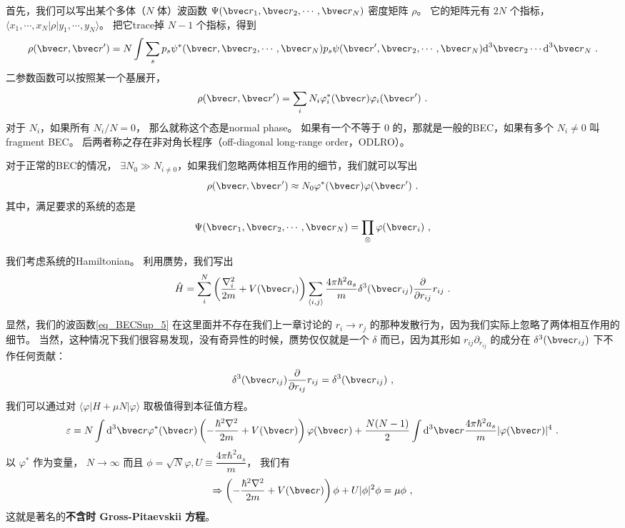 首先，我们可以写出某个多体（$N$ 体）波函数 $\Psi({\bvec r}_1,{\bvec r}_2,\cdots,{\bvec r}_N)$ 密度矩阵 $\rho$。 它的矩阵元有 $2N$ 个指标， $\langle x_1,\cdots,x_N|\rho|y_1,\cdots,y_N\rangle$。 把它trace掉 $N-1$ 个指标，得到
\begin{equation}
\rho({\bvec r},{\bvec r'}) = N\int\sum_s p_s\psi^*({\bvec r},{\bvec r}_2,\cdots,{\bvec r}_N)p_s\psi({\bvec r'},{\bvec r}_2,\cdots,{\bvec r}_N)\text{d}^3{\bvec r}_2\cdots\text{d}^3{\bvec r}_N~.
\end{equation}
二参数函数可以按照某一个基展开，
\begin{equation}
\rho({\bvec r},{\bvec r'}) = \sum_i N_i \varphi_i^*({\bvec r})\varphi_i({\bvec r'})~.
\end{equation}
对于 $N_i$，如果所有 $N_i/N=0$， 那么就称这个态是normal phase。 如果有一个不等于 $0$ 的，那就是一般的BEC，如果有多个 $N_i\neq0$ 叫 fragment BEC。 后两者称之存在非对角长程序（off-diagonal long-range order，ODLRO）。

对于正常的BEC的情况， $\exists N_0\gg N_{i\neq0}$，如果我们忽略两体相互作用的细节，我们就可以写出
\begin{equation}
\rho({\bvec r,\bvec r'}) \approx N_0\varphi^*({\bvec r})\varphi({\bvec r'})~.
\end{equation}
其中，满足要求的系统的态是
\begin{equation}\label{eq_BECSup_5}
\Psi({\bvec r}_1,{\bvec r}_2,\cdots,{\bvec r}_N) = \prod_{\otimes}\varphi({\bvec r}_i)~,
\end{equation}


我们考虑系统的Hamiltonian。 利用赝势，我们写出
\begin{equation}
\hat{H} = \sum_i^N \left(\frac{\nabla_i^2}{2m}+V({\bvec r}_i)\right)\sum_{\langle i,j\rangle}\frac{4\pi\hbar^2 a_s}{m}\delta^3({\bvec r}_{ij})\frac{\partial}{\partial r_{ij}}r_{ij}~.
\end{equation}


显然，我们的波函数\autoref{eq_BECSup_5} 在这里面并不存在我们上一章讨论的 $r_i\to r_j$ 的那种发散行为，因为我们实际上忽略了两体相互作用的细节。 当然，这种情况下我们很容易发现，没有奇异性的时候，赝势仅仅就是一个 $\delta$ 而已，因为其形如 $r_{ij}\partial_{r_{ij}}$ 的成分在 $\delta^3({\bvec r}_{ij})$ 下不作任何贡献：
\begin{equation}
\delta^3({\bvec r}_{ij})\frac{\partial}{\partial r_{ij}}r_{ij} = \delta^3({\bvec r}_{ij})~,
\end{equation}
我们可以通过对 $\langle \varphi|H+\mu N|\varphi\rangle$ 取极值得到本征值方程。
\begin{equation}
\varepsilon = N\int \text{d}^3{\bvec r}\varphi^*({\bvec r})\left(-\frac{\hbar^2\nabla^2}{2m}+V({\bvec r})\right)\varphi({\bvec r})+\frac{N(N-1)}{2}\int \text{d}^3{\bvec r}\frac{4\pi\hbar^2a_s}{m}|\varphi({\bvec r})|^4~.
\end{equation}
以 $\varphi^*$ 作为变量， $N\to\infty$ 而且 $\phi = \sqrt{N}\varphi, U\equiv \dfrac{4\pi\hbar^2a_s}{m}$， 我们有
\begin{equation}
\Rightarrow \left(-\frac{\hbar^2\nabla^2}{2m}+V({\bvec r})\right)\phi + U|\phi|^2\phi = \mu\phi~,
\end{equation}
这就是著名的\textbf{不含时 Gross-Pitaevskii 方程}。

